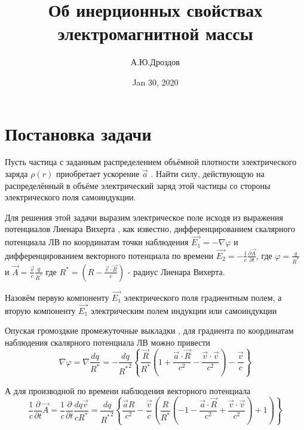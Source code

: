 \documentclass{article}
\begin{document}
\title{Об инерционных свойствах электромагнитной массы}

\author{А.Ю.Дроздов}

\date{Jan 30, 2020}


\begin{titlepage}
\maketitle
\end{titlepage}


\section{Постановка задачи}



Пусть частица с заданным распределением объёмной плотности электрического заряда $\rho \left( r \right)$ приобретает ускорение $\overrightarrow{a}$ . Найти силу, действующую на распределённый в объёме электрический заряд этой частицы со стороны электрического поля самоиндукции.


Для решения этой задачи выразим электрическое поле исходя из выражения потенциалов Лиенара Вихерта \cite{LL2}, как известно, дифференцированием скалярного потенциала ЛВ по координатам точки наблюдения $\overrightarrow{E_1} = - \nabla\varphi$ и дифференцированием векторного потенциала по времени $\overrightarrow{E_2}=-\frac{1}{c}\frac{\partial \overrightarrow{A}}{\partial t}$, где
$\varphi=\frac{q}{{{R}^{*}}}$
и
$\overrightarrow{A}=\frac{\overrightarrow{v}}{c}\frac{q}{{{R}^{*}}}$
где ${{R}^{*}}=\left( R-\frac{\overrightarrow{v}\cdot \overrightarrow{R}}{c} \right)$ - радиус Лиенара Вихерта.

Назовём первую компоненту $\overrightarrow{E_1}$ электрического поля градиентным полем, а вторую компоненту $\overrightarrow{E_1}$ электрическим полем индукции или самоиндукции


Опуская громоздкие промежуточные выкладки \cite{rustot}, для градиента по координатам наблюдения скалярного потенциала ЛВ можно привести
	\[\nabla \varphi =\nabla \frac{dq}{{{R}^{*}}}=-\frac{dq}{{{R}^{*}}^{2}}\left\{ \frac{\overrightarrow{R}}{{{R}^{*}}}\left( 1+\frac{\overrightarrow{a}\cdot \overrightarrow{R}}{{{c}^{2}}}-\frac{\overrightarrow{v}\cdot \overrightarrow{v}}{{{c}^{2}}} \right)-\frac{\overrightarrow{v}}{c} \right\}\] 	

А для производной по времени наблюдения векторного потенциала 
	\[\frac{1}{c}\frac{\partial }{\partial t}\overrightarrow{A}=\frac{1}{c}\frac{\partial }{\partial t}\frac{dq\overrightarrow{v}}{c{{R}^{*}}}=\frac{dq}{{{R}^{*}}^{2}}\left\{ \frac{\overrightarrow{a}R}{{{c}^{2}}}-\frac{\overrightarrow{v}}{c}\left( \frac{R}{{{R}^{*}}}\left( -1-\frac{\overrightarrow{a}\cdot \overrightarrow{R}}{{{c}^{2}}}+\frac{\overrightarrow{v}\cdot \overrightarrow{v}}{{{c}^{2}}} \right)+1 \right) \right\}\] 	
\end{document}
